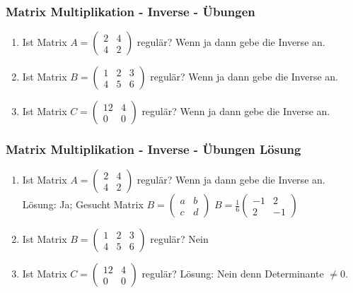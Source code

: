 \begin{frame}
\frametitle{Matrix Multiplikation - Inverse - Übungen}
\begin{enumerate}
\item Ist Matrix $A = \begin{pmatrix} 2 & 4 \\ 4 & 2 \end{pmatrix}$ regulär? Wenn ja dann gebe die Inverse an.
\item Ist Matrix $B = \begin{pmatrix} 1 & 2 & 3 \\ 4 & 5 & 6 \end{pmatrix}$ regulär? Wenn ja dann gebe die Inverse an.
\item Ist Matrix $C = \begin{pmatrix} 12 & 4 \\ 0 & 0  \end{pmatrix}$ regulär? Wenn ja dann gebe die Inverse an.
\end{enumerate}
\end{frame}

\begin{frame}
\frametitle{Matrix Multiplikation - Inverse - Übungen Lösung}
\begin{enumerate}
\item Ist Matrix $A = \begin{pmatrix} 2 & 4 \\ 4 & 2 \end{pmatrix}$ regulär? Wenn ja dann gebe die Inverse an. \\
Lösung: Ja; Gesucht Matrix $B = \begin{pmatrix} a & b \\ c & d \end{pmatrix}$
$B = \frac{1}{6}\begin{pmatrix} -1 & 2 \\ 2 & -1 \end{pmatrix}$
\item Ist Matrix $B = \begin{pmatrix} 1 & 2 & 3 \\ 4 & 5 & 6 \end{pmatrix}$ regulär? Nein
\item  Ist Matrix $C = \begin{pmatrix} 12 & 4 \\ 0 & 0  \end{pmatrix}$ regulär?
Lösung: Nein denn Determinante $\neq 0$.
\end{enumerate}
\end{frame}

